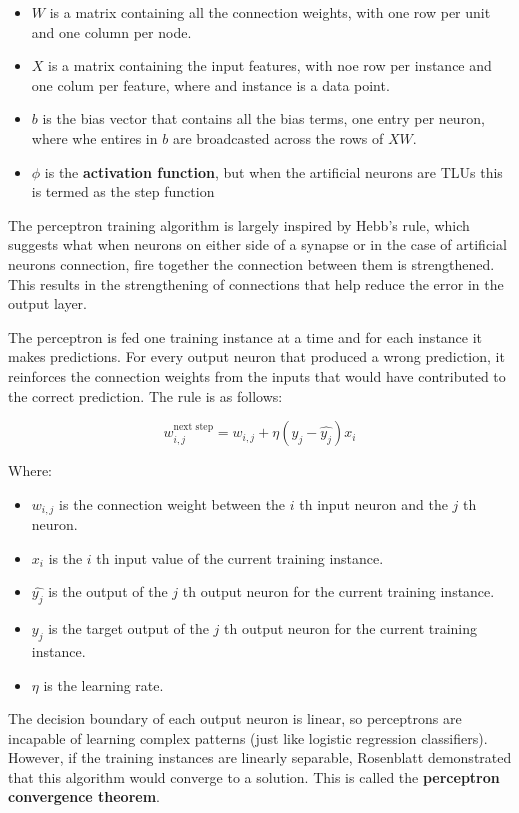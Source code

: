 \documentclass[12pt letter]{report}
\begin{document}
\begin{itemize}
\item
  \(W\) is a matrix containing all the connection weights, with one row
  per unit and one column per node.
\item
  \(X\) is a matrix containing the input features, with noe row per
  instance and one colum per feature, where and instance is a data
  point.
\item
  \(b\) is the bias vector that contains all the bias terms, one entry
  per neuron, where whe entires in \(b\) are broadcasted across the rows
  of \(XW\).
\item
  \(\phi\) is the \textbf{activation function}, but when the artificial
  neurons are TLUs this is termed as the step function
\end{itemize}

The perceptron training algorithm is largely inspired by Hebb's rule,
which suggests what when neurons on either side of a synapse or in the
case of artificial neurons connection, fire together the connection
between them is strengthened. This results in the strengthening of
connections that help reduce the error in the output layer.

The perceptron is fed one training instance at a time and for each
instance it makes predictions. For every output neuron that produced a
wrong prediction, it reinforces the connection weights from the inputs
that would have contributed to the correct prediction. The rule is as
follows:

\[
w_{i, j}^{\text{next step}} = w_{i,j} + \eta (y_j - \hat{y_j})x_i
\]

Where:

\begin{itemize}
\item
  \(w_{i,j}\) is the connection weight between the \(i\) th input neuron
  and the \(j\) th neuron.
\item
  \(x_i\) is the \(i\) th input value of the current training instance.
\item
  \(\hat{y_j}\) is the output of the \(j\) th output neuron for the
  current training instance.
\item
  \(y_j\) is the target output of the \(j\) th output neuron for the
  current training instance.
\item
  \(\eta\) is the learning rate.
\end{itemize}

The decision boundary of each output neuron is linear, so perceptrons
are incapable of learning complex patterns (just like logistic
regression classifiers). However, if the training instances are linearly
separable, Rosenblatt demonstrated that this algorithm would converge to
a solution.⁠ This is called the \textbf{perceptron convergence theorem}.
\end{document}
